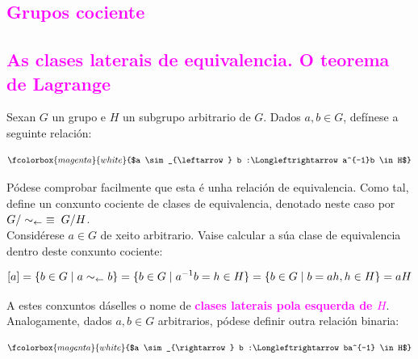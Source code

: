\documentclass[twoside]{report}
\theoremstyle{mystyle}
\begin{document}
\textcolor{magenta}{\section{Grupos cociente}}

\textcolor{magenta}{\subsection{As clases laterais de equivalencia. O teorema de Lagrange}}

\vspace{3mm}

\noindent Sexan $G$ un grupo e $H$ un subgrupo arbitrario de $G$. Dados $a,b \in G$, defínese a seguinte relación: 

$$\fcolorbox{magenta}{white}{$a \sim_{\leftarrow} b :\Longleftrightarrow a^{-1}b \in H$}$$

\vspace{3mm}

\noindent Pódese comprobar facilmente que esta é unha relación de equivalencia. Como tal, define un conxunto cociente de clases de equivalencia, denotado neste caso por $G/\sim_{\leftarrow} \hspace{1mm} \equiv \hspace{1mm} G/H$. \\

\noindent Considérese $a \in G$ de xeito arbitrario. Vaise calcular a súa clase de equivalencia dentro deste conxunto cociente: 

$$[a] = \{ b \in G \hspace{1MM} | \hspace{1MM} a \sim_{\leftarrow} b \} = \{ b \in G \hspace{1MM} | \hspace{1MM} a^{-1}b = h \in H \} = \{ b \in G \hspace{1MM} | \hspace{1MM} b = ah, h \in H \} = aH$$

\vspace{2mm}

\noindent A estes conxuntos dáselles o nome de \textcolor{magenta}{\textbf{clases laterais pola esquerda de $H$}}.\\

\noindent Analogamente, dados $a,b \in G$ arbitrarios, pódese definir outra relación binaria:

$$\fcolorbox{magenta}{white}{$a \sim_{\rightarrow} b :\Longleftrightarrow ba^{-1} \in H$}$$
\end{document}
